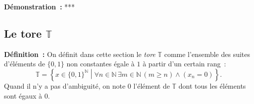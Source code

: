 \noindent\textbf{Démonstration :} ***

\subsection{Le tore \texorpdfstring{$\mathbb{T}$}{T}}

\noindent\textbf{Définition :} On définit dans cette section le \emph{tore} $\mathbb{T}$ comme l'ensemble des suites d'éléments de $\lbrace 0, 1 \rbrace$ non constantes égale à $1$ à partir d'un certain rang : 
\begin{equation*}
    \mathbb{T} = \left\lbrace
        x \in \lbrace 0, 1 \rbrace^{\mathbb{N}} 
        \middle\vert
        \forall n \in \mathbb{N} \, \exists m \in \mathbb{N} \, (m \geq n) \wedge (x_n = 0)
    \right\rbrace .
\end{equation*}
Quand il n'y a pas d'ambiguité, on note $0$ l'élément de $\mathbb{T}$ dont tous les éléments sont égaux à $0$.

